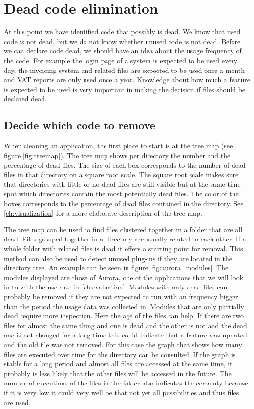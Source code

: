 \chapter{Dead code elimination}
\label{ch:elimination}

At this point we have identified code that possibly is dead. We know that used code is not dead, but we do not know whether unused code is not dead.
Before we can declare code dead, we should have an idea about the usage frequency of the code. For example the login page of a system is expected to be used every day, the invoicing system and related files are expected to be used once a month and VAT reports are only used once a year. Knowledge about how much a feature is expected to be used is very important in making the decision if files should be declared dead. 


\section{Decide which code to remove}

When cleaning an application, the first place to start is at the tree map (see figure \ref{fig:treemap}). The tree map shows per directory the number and the percentage of dead files. The size of each box corresponds to the number of dead files in that directory on a square root scale. The square root scale makes sure that directories with little or no dead files are still visible but at the same time spot which directories contain the most potentially dead files. The color of the boxes corresponds to the percentage of dead files contained in the directory. See \autoref{ch:visualization} for a more elaborate description of the tree map.

The tree map can be used to find files clustered together in a folder that are all dead. Files grouped together in a directory are usually related to each other. If a whole folder with related files is dead  it offers a starting point for removal. This method can also be used to detect unused plug-ins if they are located in the directory tree. An example can be seen in figure \ref{fig:aurora_modules}. The modules displayed are those of Aurora, one of the applications that we will look in to with the use case in \autoref{ch:evaluation}. Modules with only dead files can probably be removed if they are not expected to run with an frequency bigger than the period the usage data was collected in. Modules that are only partially dead require more inspection. Here the age of the files can help. If there are two files for almost the same thing and one is dead and the other is not and the dead one is not changed for a long time this could indicate that a feature was updated and the old file was not removed. For this case the graph that shows how many files are executed over time for the directory can be consulted. If the graph is stable for a long period and almost all files are accessed at the same time, it probably is less likely that the other files will be accessed in the future. The number of executions of the files in the folder also indicates the certainty because if it is very low it could very well be that not yet all possibilities and thus files are used.

